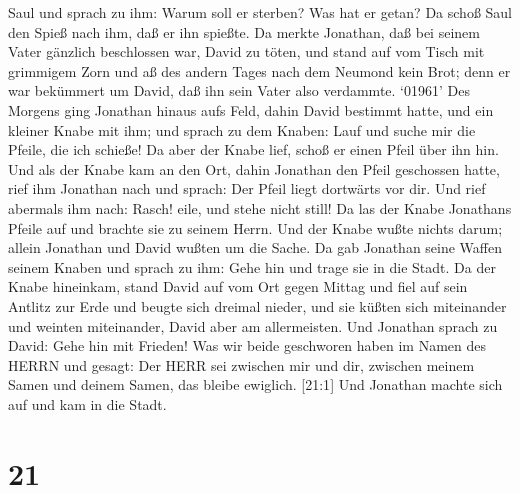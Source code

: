 Saul und sprach zu ihm: Warum soll er sterben? Was hat er getan?
 Da schoß Saul den Spieß nach ihm, daß er ihn spießte. Da
merkte Jonathan, daß bei seinem Vater gänzlich beschlossen war, David zu
töten,  und stand auf vom Tisch mit grimmigem Zorn und aß
des andern Tages nach dem Neumond kein Brot; denn er war bekümmert um
David, daß ihn sein Vater also verdammte.  `01961' Des
Morgens ging Jonathan hinaus aufs Feld, dahin David bestimmt hatte, und
ein kleiner Knabe mit ihm;  und sprach zu dem Knaben: Lauf
und suche mir die Pfeile, die ich schieße! Da aber der Knabe lief, schoß
er einen Pfeil über ihn hin.  Und als der Knabe kam an den
Ort, dahin Jonathan den Pfeil geschossen hatte, rief ihm Jonathan nach
und sprach: Der Pfeil liegt dortwärts vor dir.  Und rief
abermals ihm nach: Rasch! eile, und stehe nicht still! Da las der Knabe
Jonathans Pfeile auf und brachte sie zu seinem Herrn.  Und
der Knabe wußte nichts darum; allein Jonathan und David wußten um die
Sache.  Da gab Jonathan seine Waffen seinem Knaben und
sprach zu ihm: Gehe hin und trage sie in die Stadt.  Da der
Knabe hineinkam, stand David auf vom Ort gegen Mittag und fiel auf sein
Antlitz zur Erde und beugte sich dreimal nieder, und sie küßten sich
miteinander und weinten miteinander, David aber am allermeisten.
 Und Jonathan sprach zu David: Gehe hin mit Frieden! Was
wir beide geschworen haben im Namen des HERRN und gesagt: Der HERR sei
zwischen mir und dir, zwischen meinem Samen und deinem Samen, das bleibe
ewiglich. {[}21:1{]} Und Jonathan machte sich auf und kam in die Stadt.

\hypertarget{section-20}{%
\section{21}\label{section-20}}

